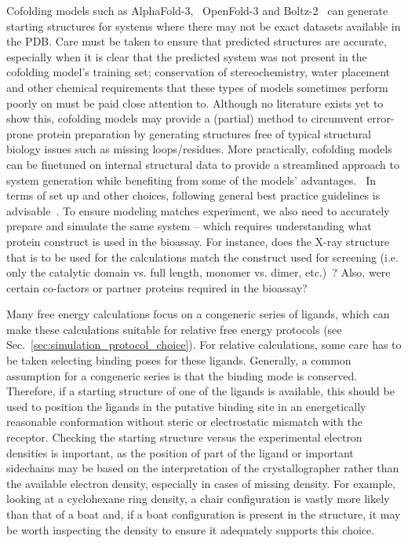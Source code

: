 \documentclass[9pt,bestpractices]{livecoms}
\begin{document}
Cofolding models such as AlphaFold-3,~\cite{abramson_2024} OpenFold-3 and Boltz-2~\cite{passaro_2025} can generate starting structures for systems where there may not be exact datasets available in the PDB. Care must be taken to ensure that predicted structures are accurate, especially when it is clear that the predicted system was not present in the cofolding model's training set; conservation of stereochemistry, water placement and other chemical requirements that these types of models sometimes perform poorly on must be paid close attention to. Although no literature exists yet to show this, cofolding models may provide a (partial) method to circumvent error-prone protein preparation by generating structures free of typical structural biology issues such as missing loops/residues. More practically, cofolding models can be finetuned on internal structural data to provide a streamlined approach to system generation while benefiting from some of the models' advantages.~\cite{scheen_2025,thaler2026boltz, beuming_2022, coskun_2023} In terms of set up and other choices, following general best practice guidelines is advisable~\cite{braun2019best}. To ensure modeling matches experiment, we also need to accurately prepare and simulate the same system -- which requires understanding what protein construct is used in the bioassay. For instance, does the X-ray structure that is to be used for the calculations match the construct used for screening (i.e. only the catalytic domain vs. full length, monomer vs. dimer, etc.)~\cite{perez-benito2018predicting}? Also, were certain co-factors or partner proteins required in the bioassay? 

Many free energy calculations focus on a congeneric series of ligands, which can make these calculations suitable for relative free energy protocols (see Sec.~\ref{sec:simulation_protocol_choice}). For relative calculations, some care has to be taken selecting binding poses for these ligands. Generally, a common assumption for a congeneric series is that the binding mode is conserved. Therefore, if a starting structure of one of the ligands is available, this should be used to position the ligands in the putative binding site in an energetically reasonable conformation without steric or electrostatic mismatch with the receptor. Checking the starting structure versus the experimental electron densities is important, as the position of part of the ligand or important sidechains may be based on the interpretation of the crystallographer rather than the available electron density, especially in cases of missing density. For example, looking at a cyclohexane ring density, a chair configuration is vastly more likely than that of a boat and, if a boat configuration is present in the structure, it may be worth inspecting the density to ensure it adequately supports this choice. 
\end{document}
